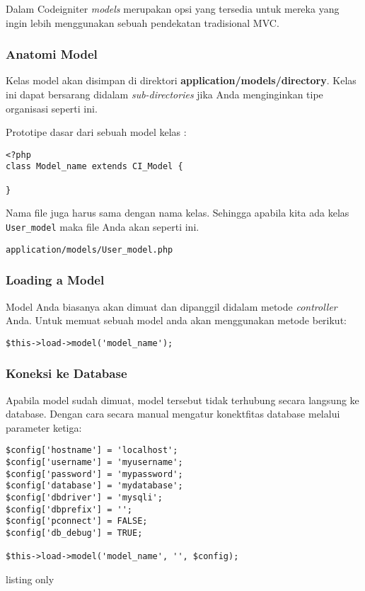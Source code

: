 Dalam Codeigniter \textit{models} merupakan opsi yang tersedia untuk mereka yang ingin lebih menggunakan sebuah pendekatan tradisional MVC.\cite{codeigniter:17}

\subsubsection{Anatomi Model}
\label{sssec:model_1}

Kelas model akan disimpan di direktori \textbf{application/models/directory}. Kelas ini dapat bersarang didalam \textit{sub-directories} jika Anda menginginkan tipe organisasi seperti ini. \cite{codeigniter:17}

Prototipe dasar dari sebuah model kelas :
\begin{lstlisting}[frame=single]  
<?php
class Model_name extends CI_Model {

}
\end{lstlisting}

Nama file juga harus sama dengan nama kelas. Sehingga apabila kita ada kelas \verb|User_model| maka file Anda akan seperti ini.

\begin{lstlisting}[frame=single]  
application/models/User_model.php
\end{lstlisting}

\subsubsection{Loading a Model}
\label{sssec:model_2}

Model Anda biasanya akan dimuat dan dipanggil didalam metode \textit{controller} Anda. Untuk memuat sebuah model anda akan menggunakan metode berikut:\cite{codeigniter:17}

\begin{lstlisting}[frame=single] 
$this->load->model('model_name');
\end{lstlisting}

\subsubsection{Koneksi ke Database}
\label{sssec:model_3}
Apabila model sudah dimuat, model tersebut tidak terhubung secara langsung ke database. Dengan cara secara manual mengatur konektfitas database melalui parameter ketiga:\cite{codeigniter:17}

\begin{lstlisting}[frame=single]
$config['hostname'] = 'localhost';
$config['username'] = 'myusername';
$config['password'] = 'mypassword';
$config['database'] = 'mydatabase';
$config['dbdriver'] = 'mysqli';
$config['dbprefix'] = '';
$config['pconnect'] = FALSE;
$config['db_debug'] = TRUE;

$this->load->model('model_name', '', $config);
\end{lstlisting}{listing only}

